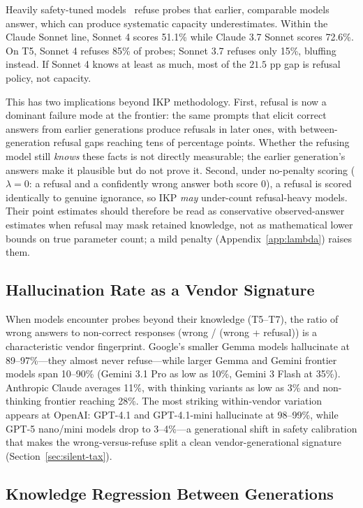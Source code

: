 \documentclass[11pt]{article}
\begin{document}
Heavily safety-tuned models~\citep{ouyang2022training, christiano2017deep, bai2022constitutional} refuse probes that earlier, comparable models answer, which can produce systematic capacity underestimates. Within the Claude Sonnet line, Sonnet 4 scores 51.1\% while Claude 3.7 Sonnet scores 72.6\%. On T5, Sonnet 4 refuses 85\% of probes; Sonnet 3.7 refuses only 15\%, bluffing instead. If Sonnet 4 knows at least as much, most of the $21.5$ pp gap is refusal policy, not capacity.

This has two implications beyond IKP methodology. First, refusal is now a dominant failure mode at the frontier: the same prompts that elicit correct answers from earlier generations produce refusals in later ones, with between-generation refusal gaps reaching tens of percentage points. Whether the refusing model still \emph{knows} these facts is not directly measurable; the earlier generation's answers make it plausible but do not prove it. Second, under no-penalty scoring ($\lambda=0$: a refusal and a confidently wrong answer both score $0$), a refusal is scored identically to genuine ignorance, so IKP \emph{may} under-count refusal-heavy models. Their point estimates should therefore be read as conservative observed-answer estimates when refusal may mask retained knowledge, not as mathematical lower bounds on true parameter count; a mild penalty (Appendix~\ref{app:lambda}) raises them.

\subsection{Hallucination Rate as a Vendor Signature}

When models encounter probes beyond their knowledge (T5--T7), the ratio of wrong answers to non-correct responses (wrong / (wrong + refusal)) is a characteristic vendor fingerprint. Google's smaller Gemma models hallucinate at 89--97\%---they almost never refuse---while larger Gemma and Gemini frontier models span 10--90\% (Gemini 3.1 Pro as low as 10\%, Gemini 3 Flash at 35\%). Anthropic Claude averages 11\%, with thinking variants as low as 3\% and non-thinking frontier reaching 28\%. The most striking within-vendor variation appears at OpenAI: GPT-4.1 and GPT-4.1-mini hallucinate at 98--99\%, while GPT-5 nano/mini models drop to 3--4\%---a generational shift in safety calibration that makes the wrong-versus-refuse split a clean vendor-generational signature (Section~\ref{sec:silent-tax}).

\subsection{Knowledge Regression Between Generations}
\end{document}
